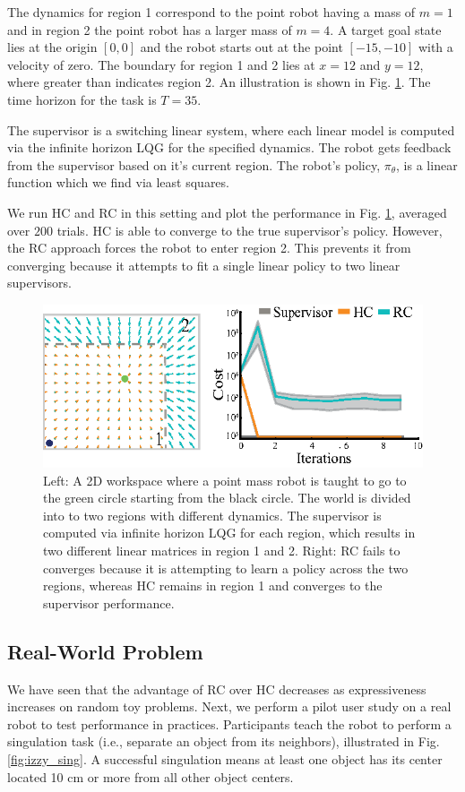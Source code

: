 \documentclass[10pt, conference]{ieeeconf}      %
\begin{document}
The dynamics for region 1 correspond to the point robot having a mass of $m=1$ and in region 2 the point robot has a larger mass of $m=4$. A target goal state lies at the origin $[0,0]$ and the robot starts out at the point $[-15,-10]$ with a velocity of zero. The boundary for region 1 and 2 lies at $x=12$ and $y=12$, where greater than indicates region 2. An illustration is shown in Fig. \ref{fig:p_mass}. The time horizon for the task is $T=35$. 

The supervisor is a switching linear system, where each linear model is computed via the infinite horizon LQG for the specified dynamics. The robot gets feedback from the supervisor based on it's current region. The robot's policy, $\pi_{\theta}$, is a linear function which we find via least squares. 

We run HC and RC in this setting and plot the performance in Fig. \ref{fig:p_mass}, averaged over $200$ trials.  HC is able to converge to the true supervisor's policy.
However, the RC approach forces the robot to enter region 2.
This prevents it from converging because it attempts to fit a single linear policy to two linear supervisors.

\begin{figure}
\centering
\includegraphics{f_figs/p_mass.eps}
\caption{
    \footnotesize
Left: A 2D workspace where a point mass robot is taught to go to the green circle starting from the black circle. The world is divided into to two regions with different dynamics. The supervisor is computed via infinite horizon LQG for each region, which results in two different linear matrices in region 1 and 2. Right: RC fails to converges because it is attempting to learn a policy across the two regions, whereas HC remains in region 1 and converges to the supervisor performance. }
\vspace*{-20pt}
\label{fig:p_mass}
\end{figure}

 \subsection{Real-World Problem}
We have seen that the advantage of RC over HC decreases as expressiveness increases on random toy problems. Next, we perform a pilot user study on a real robot to test performance in practices.
Participants teach the robot to perform a singulation task (i.e., separate an object from its neighbors), illustrated in Fig. \ref{fig:izzy_sing}. A successful singulation means at least one object has its center located 10 cm or more from all other object centers. 
\end{document}
